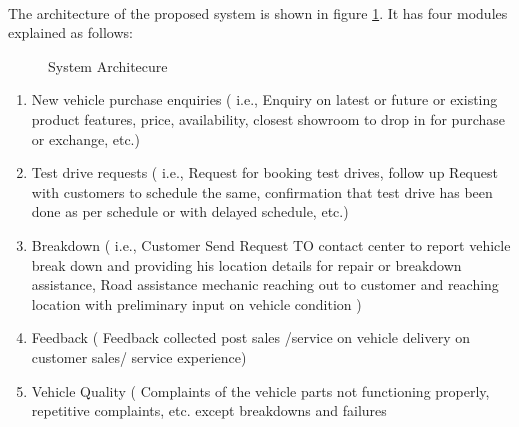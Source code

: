 \paragraph{}The architecture of the proposed system is shown in figure \ref{fig:block_diagram}. It has four modules explained as follows:
\begin{figure}[!h]
\begin{center}
\caption{System Architecure}
\label{fig:block_diagram}
\end{center}
\end{figure}
\newpage
\begin{enumerate}
	

\item New vehicle purchase enquiries ( i.e., Enquiry on latest or future or existing product features, price, availability, closest showroom to drop in for purchase or exchange, etc.)
\item Test drive requests ( i.e., Request for booking test drives, follow up Request with customers to schedule the same, confirmation that test drive has been done as per schedule or with delayed schedule, etc.)
\item Breakdown ( i.e., Customer Send Request TO  contact center to report vehicle break down and providing his location details for repair or breakdown assistance, Road assistance mechanic reaching out to customer and reaching location with preliminary input on vehicle condition )
\item Feedback ( Feedback collected post sales /service on vehicle delivery on customer sales/ service experience)
\item Vehicle Quality ( Complaints of the vehicle parts not functioning properly, repetitive complaints, etc.  except breakdowns and failures
\end{enumerate}

